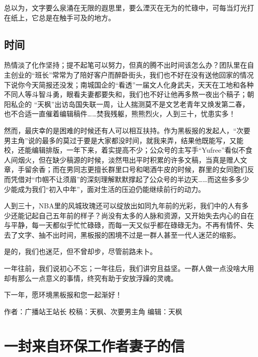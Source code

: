 \documentclass[
]{book}
\begin{document}
总以为，文字要么泉涌在无限的遐思里，要么湮灭在无为的忙碌中，可每当灯光打在纸上，它总是在触手可及的地方。

\hypertarget{ux65f6ux95f4}{%
\subsection{时间}\label{ux65f6ux95f4}}

热情淡了化作坚持；提不起笔可以努力，但真的腾不出时间该怎么办？团队里在自主创业的``班长''常常为了陪好客户而醉卧街头，我们也不好在没有送他回家的情况下说你今天简报还没发；南城国企的``看透''一届文人化身武夫，天天在工地和各种不同人等斗智斗勇，眼看夫妻都要失和，我们也不好让他再多熬一夜出个稿子；朝阳私企的 ``天枫''出访岛国失联一周，让人揣测莫不是文艺老青年又焕发第二春，也不合适一直催着编辑稿件\ldots\ldots 焚我残躯，熊熊烈火，人到三十，忧患实多！

然而，最庆幸的是困难的时候还有人可以相互扶持。作为黑板报的发起人，``次要男主角''说的最多的莫过于要是大家都没时间，就我来弄，结果他既能写，又能校，还能编辑排版，一年下来，着实提高不少；公众号的主写手``Yufree''看似不食人间烟火，但在缺少稿源的时候，淡然甩出平时积累的许多文稿，当真是赠人文章，手留余香；而在男同志更擅长群里口号和喝酒牛皮的时候，群里的女同胞们反而凭借对``巾帼不让须眉''的深刻理解默默撑起了公众号的半边天\ldots\ldots 而这些多多少少能成为我们``初入中年''，面对生活的压迫仍能继续前行的动力。

人到三十，NBA里的风城玫瑰还可以绽放出如同九年前的光彩，我们中的人有多少还能记起自己五年前的样子？尚没有太多的人脉和资源，又开始失去内心的自在与平静，每一天都似乎忙忙碌碌，而每一天又似乎都在碌碌无为。不再有情怀、失去了文字、抽不出时间，黑板报的困境不过是一群人甚至一代人迷茫的缩影。

是的，我们也迷茫，但不曾却步，尽管前路未卜。

一年往前，我们说初心不忘；一年往后，我们讲穷且益坚。一群人做一点没啥大用却有那么一点意义的事情，终究有助于安放浮躁的灵魂。

下一年，愿环境黑板报和您一起渐好！

作者：广播站王站长
校稿：天枫、次要男主角
编辑：天枫

\hypertarget{ux4e00ux5c01ux6765ux81eaux73afux4fddux5de5ux4f5cux8005ux59bbux5b50ux7684ux4fe1}{%
\section{一封来自环保工作者妻子的信}\label{ux4e00ux5c01ux6765ux81eaux73afux4fddux5de5ux4f5cux8005ux59bbux5b50ux7684ux4fe1}}
\end{document}
